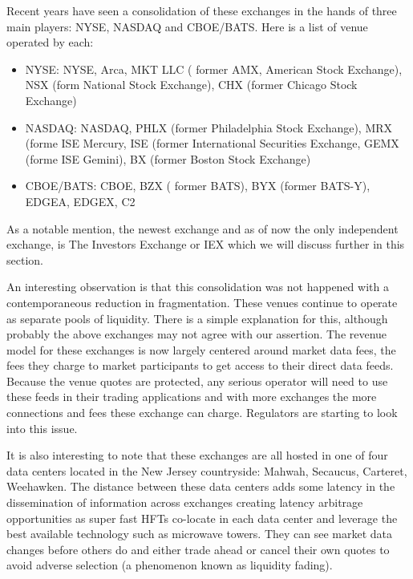 Recent years have seen a consolidation of these exchanges in the hands of three main players: NYSE, NASDAQ and CBOE/BATS. Here is a list of venue operated by each:
        \begin{itemize}
        \item NYSE: NYSE, Arca, MKT LLC ( former AMX, American Stock Exchange), NSX (form National Stock Exchange), CHX (former Chicago Stock Exchange)
        \item NASDAQ:  NASDAQ, PHLX (former Philadelphia Stock Exchange), MRX (forme ISE Mercury, ISE (former International Securities Exchange, GEMX (forme ISE Gemini), BX (former Boston Stock Exchange)
        \item CBOE/BATS: CBOE, BZX ( former BATS), BYX (former BATS-Y), EDGEA, EDGEX, C2
        \end{itemize}
As a notable mention, the newest exchange and as of now the only independent exchange, is The Investors Exchange or IEX which we will discuss further in this section.


An interesting observation is that this consolidation was not happened with a contemporaneous reduction in fragmentation. These venues continue to operate as separate pools of liquidity. There is a simple explanation for this, although probably the above exchanges may not agree with our assertion. The revenue model for these exchanges is now largely centered around market data fees, the fees they charge to market participants to get access to their direct data feeds. Because the venue quotes are protected, any serious operator will need to use these feeds in their trading applications and with more exchanges the more connections and fees these exchange can charge.  Regulators are starting to look into this issue.


It is also interesting to note that these exchanges are all hosted in one of four data centers located in the New Jersey countryside: Mahwah, Secaucus, Carteret, Weehawken.  The distance between these data centers adds some latency in the dissemination of information across exchanges creating latency arbitrage opportunities as super fast HFTs co-locate in each data center and leverage the best available technology such as microwave towers. They can see market data changes before others do and either trade ahead or cancel their own quotes to avoid adverse selection (a phenomenon known as liquidity fading).


